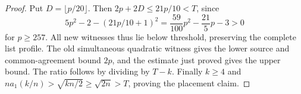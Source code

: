 \begin{proof}
Put $D=\lfloor p/20\rfloor$. Then $2p+2D\le21p/10<T$, since
\[
 5p^2-2-(21p/10+1)^2
   =\frac{59}{100}p^2-\frac{21}{5}p-3>0
\]
for $p\ge257$. All new witnesses thus lie below threshold, preserving
the complete list profile. The old simultaneous quadratic witness gives
the lower source and common-agreement bound $2p$, and the estimate just
proved gives the upper bound. The ratio follows by dividing by $T-k$.
Finally $k\ge4$ and
$na_1(k/n)>\sqrt{kn/2}\ge\sqrt{2n}>T$, proving the placement claim.
\end{proof}
